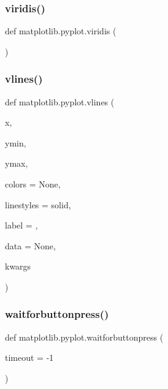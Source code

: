 \mbox{\label{namespacematplotlib_1_1pyplot_ab10de3fd21bbd2b9a7fd72d4741c1bfc}} 
\subsubsection{\texorpdfstring{viridis()}{viridis()}}
{\footnotesize\ttfamily def matplotlib.\+pyplot.\+viridis (\begin{DoxyParamCaption}{ }\end{DoxyParamCaption})}

\mbox{\label{namespacematplotlib_1_1pyplot_a3eb7160c12267e92152aeac289f850c4}} 
\subsubsection{\texorpdfstring{vlines()}{vlines()}}
{\footnotesize\ttfamily def matplotlib.\+pyplot.\+vlines (\begin{DoxyParamCaption}\item[{}]{x,  }\item[{}]{ymin,  }\item[{}]{ymax,  }\item[{}]{colors = {\ttfamily None},  }\item[{}]{linestyles = {\ttfamily \textquotesingle{}solid\textquotesingle{}},  }\item[{}]{label = {\ttfamily \textquotesingle{}\textquotesingle{}},  }\item[{}]{data = {\ttfamily None},  }\item[{}]{kwargs }\end{DoxyParamCaption})}

\mbox{\label{namespacematplotlib_1_1pyplot_a6b887bdfd9777b1600af5c25e6c49b0d}} 
\subsubsection{\texorpdfstring{waitforbuttonpress()}{waitforbuttonpress()}}
{\footnotesize\ttfamily def matplotlib.\+pyplot.\+waitforbuttonpress (\begin{DoxyParamCaption}\item[{}]{timeout = {\ttfamily -\/1} }\end{DoxyParamCaption})}

